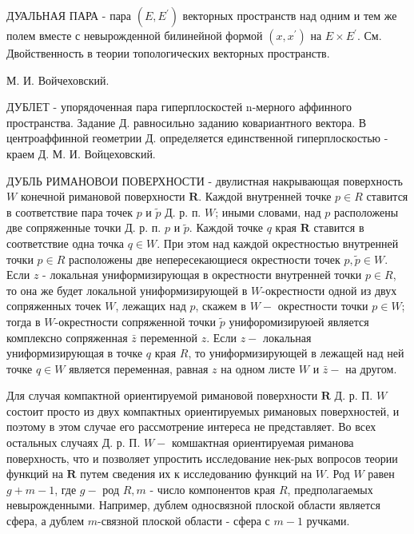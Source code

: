 \documentclass[10pt]{article}
\begin{document}
ДУАЛЬНАЯ ПАРА - пара $\left(E, E^{\prime}\right)$ векторных пространств над одним и тем же полем вместе с невырожденной билинейной формой $\left(x, x^{\prime}\right)$ на $E \times E^{\prime}$. См. Двойственность в теории топологических векторных пространств.



М. И. Войчеховский.



ДУБЛЕТ - упорядоченная пара гиперплоскостей n-мерного аффинного пространства. Задание Д. равносильно заданию ковариантного вектора. В центроаффинной геометрии Д. определяется единственной гиперплоскостью - краем Д. М. И. Войцеховский.



ДУБЛЬ РИМАНОВОИ ПОВЕРХНОСТИ - двулистная накрывающая поверхность $W$ конечной римановой поверхности $\boldsymbol{R}$. Каждой внутренней точке $p \in R$ ставится в соответствие пара точек $p$ и $\tilde{p}$ Д. р. п. $W$; иными словами, над $p$ расположены две сопряженные точки Д. р. п. $p$ и $\tilde{p}$. Каждой точке $q$ края $\boldsymbol{R}$ ставится в соответствие одна точка $q \in W$. При этом над каждой окрестностью внутренней точки $p \in R$ расположены две непересекающиеся окрестности точек $p, \tilde{p} \in W$. Если $z$ - локальная униформизирующая в окрестности внутренней точки $p \in R$, то она же будет локальной униформизирующей в $W$-окрестности одной из двух сопряженных точек $W$, лежащих над $p$, скажем в $W-$ окрестности точки $p \in W$; тогда в $W$-окрестности сопряженной точки $\tilde{p}$ унифоромизируюей является комплексно сопряженная $\bar{z}$ переменной $z$. Если $z-$ локальная униформизирующая в точке $q$ края $R$, то униформизирующей в лежащей над ней точке $q \in W$ является переменная, равная $z$ на одном листе $W$ и $\bar{z}-$ на другом.



Для случая компактной ориентируемой римановой поверхности $\boldsymbol{R}$ Д. р. П. $W$ состоит просто из двух компактных ориентируемых римановых поверхностей, и поэтому в этом случае его рассмотрение интереса не представляет. Во всех остальных случаях Д. р. П. $W-$ комшактная ориентируемая риманова поверхность, что и позволяет упростить исследование нек-рых вопросов теории функций на $\boldsymbol{R}$ путем сведения их к исследованию функций на $W$. Род $W$ равен $g+m-1$, где $g-$ род $R, m$ - число компонентов края $R$, предполагаемых невырожденными. Например, дублем односвязной плоской области является сфера, а дублем $m$-связной плоской области - сфера с $m-1$ ручками.
\end{document}
